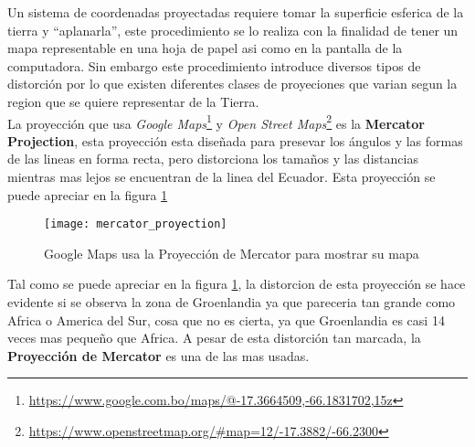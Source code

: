         Un sistema de coordenadas proyectadas requiere tomar la superficie esferica de la tierra y ``aplanarla'', este procedimiento se lo realiza con la finalidad de tener un mapa representable en una hoja de papel asi como en la pantalla de la computadora. Sin embargo este procedimiento introduce diversos tipos de distorci\'on por lo que existen diferentes clases de proyeciones que varian segun la region que se quiere representar de la Tierra.\\

        La proyecci\'on que usa \emph{Google Maps}\footnote{\url{https://www.google.com.bo/maps/@-17.3664509,-66.1831702,15z}} y \emph{Open Street Maps}\footnote{\url{https://www.openstreetmap.org/#map=12/-17.3882/-66.2300}} es la \textbf{Mercator Projection}\cite{gmaps_osm}, esta proyecci\'on esta dise\~nada para presevar los ángulos y las formas de las lineas en forma recta, pero distorciona los tama\~nos y las distancias mientras mas lejos se encuentran de la linea del Ecuador. Esta proyecci\'on se puede apreciar en la figura \ref{fig:mercator_proyection}

        \begin{figure}[H]
          \begin{center}
            \texttt{[image: mercator\_proyection]}
          \end{center}
          \caption[Sistema de coordenadas Proyectadas]{Google Maps usa la Proyección de Mercator para mostrar su mapa}
          \label{fig:mercator_proyection}
        \end{figure}

        Tal como se puede apreciar en la figura \ref{fig:mercator_proyection}, la distorcion de esta proyecci\'on se hace evidente si se observa la zona de Groenlandia ya que pareceria tan grande como Africa o America del Sur, cosa que no es cierta, ya que Groenlandia es casi 14 veces mas peque\~no que Africa. A pesar de esta distorci\'on tan marcada, la \textbf{Proyección de Mercator} es una de las mas usadas.

